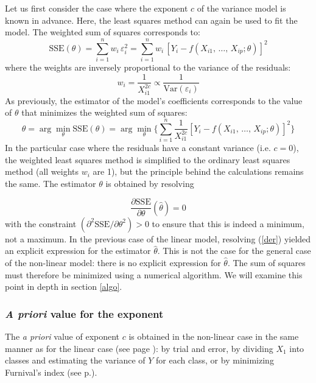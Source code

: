 Let us first consider the case where the exponent $c$ of the variance model is known in advance. Here, the least squares method can again be used to fit the model. The weighted sum of squares corresponds to:
\[
\mathrm{SSE}(\theta)=\sum_{i=1}^nw_i\,\varepsilon_i^2
=\sum_{i=1}^nw_i\,[Y_i-f(X_{i1},\,\ldots,\,X_{ip};\theta)]^2
\]
where the weights are inversely proportional to the variance of the residuals:
\[
w_i=\frac{1}{X_{i1}^{2c}}\propto\frac{1}{\mathrm{Var}(\varepsilon_i)}
\]
As previously, the estimator of the model's coefficients corresponds to the value of $\theta$ that minimizes the weighted sum of squares:
\[
\hat{\theta}=\arg\min_{\theta}\mathrm{SSE}(\theta)
=\arg\min_{\theta}\bigg\{\sum_{i=1}^n\frac{1}{X_{i1}^{2c}}
[Y_i-f(X_{i1},\,\ldots,\,X_{ip};\theta)]^2\bigg\}
\]
In the particular case where the residuals have a constant variance (i.e. $c=0$), the weighted least squares method is simplified to the ordinary least squares method (all weights $w_i$ are 1), but the principle behind the calculations remains the same. The estimator $\theta$ is obtained by resolving

\begin{equation}
\frac{\partial\mathrm{SSE}}{\partial\theta}(\hat{\theta})=0
\label{der}
\end{equation}
with the constraint $(\partial^2\mathrm{SSE}/\partial\theta^2)>0$ to ensure that this is indeed a minimum, not a maximum. In the previous case of the linear model, resolving (\ref{der}) yielded an explicit expression for the estimator $\hat{\theta}$. This is not the case for the general case of the non-linear model: there is no explicit expression for $\hat{\theta}$. The sum of squares must therefore be minimized using a numerical algorithm. We will examine this point in depth in section \ref{algo}.

\subsubsection{\textit{A priori} value for the exponent}

The \textit{a priori} value of exponent $c$ is obtained in the non-linear case in the same manner as for the linear case (see page \pageref{chx}): by trial and error, by dividing $X_1$ into classes and estimating the variance of $Y$ for each class, or by minimizing Furnival's index (see p.\pageref{furni}).

